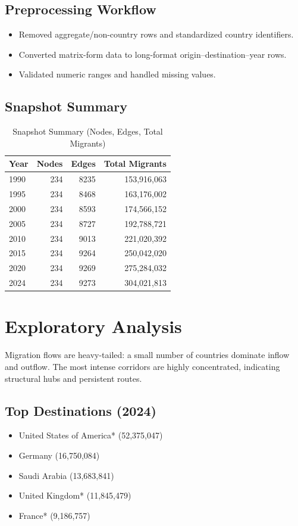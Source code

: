\documentclass[12pt]{report}
\begin{document}
\section{Preprocessing Workflow}
\begin{itemize}
    \item Removed aggregate/non-country rows and standardized country identifiers.
    \item Converted matrix-form data to long-format origin--destination--year rows.
    \item Validated numeric ranges and handled missing values.
\end{itemize}

\section{Snapshot Summary}
\begin{table}[H]
\centering
\caption{Snapshot Summary (Nodes, Edges, Total Migrants)}
\label{tab:snapshot-summary}
\begin{tabular}{lrrr}
\toprule
Year & Nodes & Edges & Total Migrants \\
\midrule
1990 & 234 & 8235 & 153,916,063 \\
1995 & 234 & 8468 & 163,176,002 \\
2000 & 234 & 8593 & 174,566,152 \\
2005 & 234 & 8727 & 192,788,721 \\
2010 & 234 & 9013 & 221,020,392 \\
2015 & 234 & 9264 & 250,042,020 \\
2020 & 234 & 9269 & 275,284,032 \\
2024 & 234 & 9273 & 304,021,813 \\
\bottomrule
\end{tabular}
\end{table}

\chapter{Exploratory Analysis}
Migration flows are heavy-tailed: a small number of countries dominate inflow and outflow. The most intense corridors are highly concentrated, indicating structural hubs and persistent routes.

\section{Top Destinations (2024)}
\begin{itemize}
    \item United States of America* (52,375,047)
    \item Germany (16,750,084)
    \item Saudi Arabia (13,683,841)
    \item United Kingdom* (11,845,479)
    \item France* (9,186,757)
\end{itemize}
\end{document}
